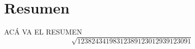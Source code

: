 \section*{Resumen}
\noindent ACÁ VA EL RESUMEN
\begin{equation}
    \sqrt{12382434198312389123012939123091}
\end{equation}